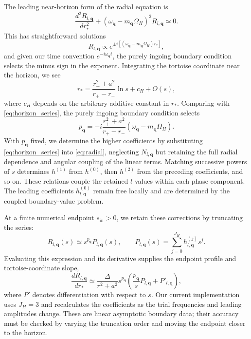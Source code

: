 \documentclass[11pt]{article}
\begin{document}
The leading near-horizon form of the radial equation is
\begin{equation}
    \label{eq:horizon_radial_eq}
    \frac{d^2R_{l,\mathbf q}}{dr_*^2} + (\omega_{\mathbf q}-m_{\mathbf q}\Omega_H)^2 R_{l,\mathbf q} \simeq 0.
\end{equation}
This has straightforward solutions 
\begin{equation}
    R_{l,\mathbf q} \propto e^{\pm i [(\omega_{\mathbf q}-m_{\mathbf q}\Omega_H)r_*]},
\end{equation}
and given our time convention $e^{-i\omega_{\mathbf q}t}$, the purely ingoing boundary condition selects the minus sign in the exponent. Integrating the tortoise coordinate near the horizon, we see
\begin{equation}
    r_*=\frac{r_+^2+a^2}{r_+-r_-}\ln s+c_H+O(s),
\end{equation}
where $c_H$ depends on the arbitrary additive constant in $r_*$.
Comparing with \eqref{eq:horizon_series}, the purely ingoing boundary condition selects
\begin{equation}
    \label{eq:horizon_exponent}
    p_{\mathbf q} =-i\frac{r_+^2+a^2}{r_+-r_-}\left(\omega_{\mathbf q}-m_{\mathbf q}\Omega_H\right).
\end{equation}
With $p_{\mathbf q}$ fixed, we determine the higher coefficients by substituting \eqref{eq:horizon_series} into \eqref{eq:radial}, neglecting $N_{l,\mathbf q}$ but retaining the full radial dependence and angular coupling of the linear terms. Matching successive powers of $s$ determines $h^{(1)}$ from $h^{(0)}$, then $h^{(2)}$ from the preceding coefficients, and so on. These relations couple the retained $l$ values within each phase component. The leading coefficients $h^{(0)}_{l,\mathbf q}$ remain free locally and are determined by the coupled boundary-value problem.

At a finite numerical endpoint $s_{\mathrm{in}}>0$, we retain these corrections by truncating the series:
\begin{equation}
    R_{l,\mathbf q}(s)\simeq s^{p_{\mathbf q}}P_{l,\mathbf q}(s),
    \qquad
    P_{l,\mathbf q}(s)=\sum_{j=0}^{J_H}h^{(j)}_{l,\mathbf q}s^j.
\end{equation}
Evaluating this expression and its derivative supplies the endpoint profile and tortoise-coordinate slope,
\begin{equation}
    \frac{dR_{l,\mathbf q}}{dr_*}
    \simeq \frac{\Delta}{r^2+a^2}s^{p_{\mathbf q}}
    \left(\frac{p_{\mathbf q}}{s}P_{l,\mathbf q}+P'_{l,\mathbf q}\right),
\end{equation}
where $P'$ denotes differentiation with respect to $s$. Our current implementation uses $J_H=3$ and recalculates the coefficients as the trial frequencies and leading amplitudes change. These are linear asymptotic boundary data; their accuracy must be checked by varying the truncation order and moving the endpoint closer to the horizon.
\end{document}
